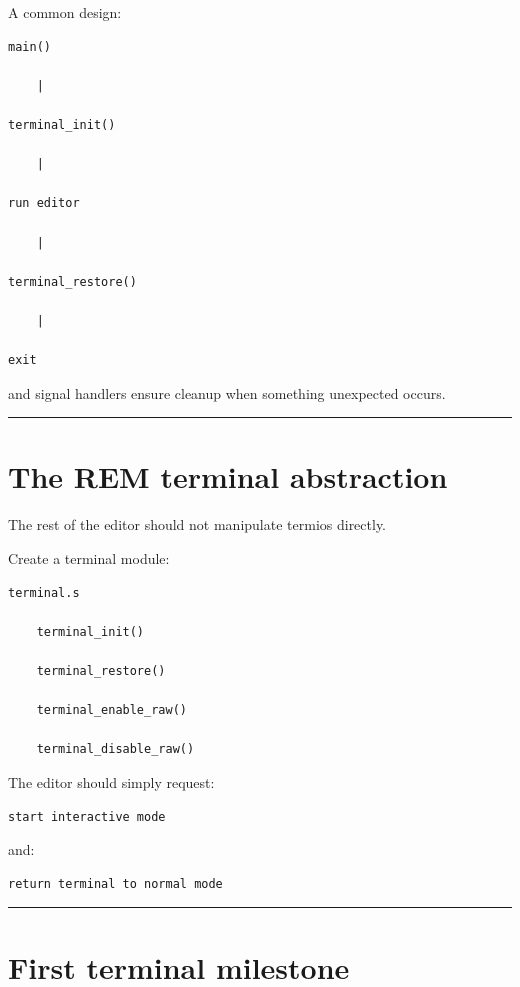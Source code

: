 \documentclass[
  oneside,
  openany]{book}
\begin{document}
A common design:

\begin{verbatim}
main()

    |

terminal_init()

    |

run editor

    |

terminal_restore()

    |

exit
\end{verbatim}

and signal handlers ensure cleanup when something unexpected occurs.

\begin{center}\rule{0.5\linewidth}{0.5pt}\end{center}

\hypertarget{the-rem-terminal-abstraction}{%
\section{The REM terminal
abstraction}\label{the-rem-terminal-abstraction}}

The rest of the editor should not manipulate termios directly.

Create a terminal module:

\begin{verbatim}
terminal.s

    terminal_init()

    terminal_restore()

    terminal_enable_raw()

    terminal_disable_raw()
\end{verbatim}

The editor should simply request:

\begin{verbatim}
start interactive mode
\end{verbatim}

and:

\begin{verbatim}
return terminal to normal mode
\end{verbatim}

\begin{center}\rule{0.5\linewidth}{0.5pt}\end{center}

\hypertarget{first-terminal-milestone}{%
\section{First terminal milestone}\label{first-terminal-milestone}}
\end{document}
